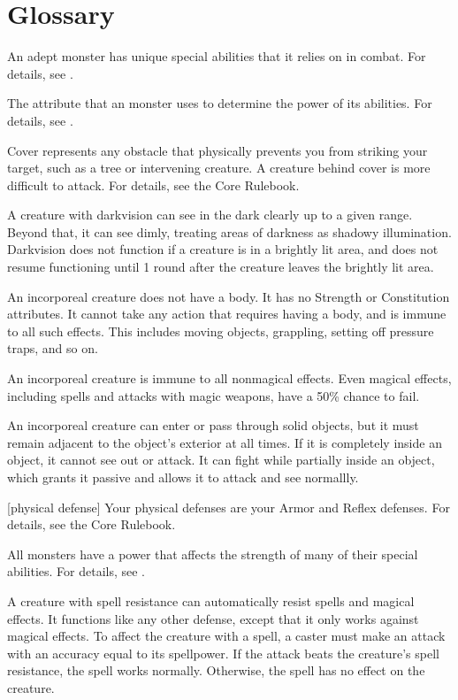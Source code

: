 \chapter{Glossary}\label{Glossary}

 An adept monster has unique special abilities that it relies on in combat.
For details, see .

 The attribute that an  monster uses to determine the power of its abilities.
For details, see .

 Cover represents any obstacle that physically prevents you from striking your target, such as a tree or intervening creature. A creature behind cover is more difficult to attack.
For details, see the Core Rulebook.

 A creature with darkvision can see in the dark clearly up to a given range.
Beyond that, it can see dimly, treating areas of darkness as shadowy illumination.
Darkvision does not function if a creature is in a brightly lit area, and does not resume functioning until 1 round after the creature leaves the brightly lit area.

 An incorporeal creature does not have a body.
It has no Strength or Constitution attributes.
It cannot take any action that requires having a body, and is immune to all such effects.
This includes moving objects, grappling, setting off pressure traps, and so on.

An incorporeal creature is immune to all nonmagical effects.
Even magical effects, including spells and attacks with magic weapons, have a 50\% chance to fail.

An incorporeal creature can enter or pass through solid objects, but it must remain adjacent to the object's exterior at all times.
If it is completely inside an object, it cannot see out or attack.
It can fight while partially inside an object, which grants it passive  and allows it to attack and see normallly.

[physical defense] Your physical defenses are your Armor and Reflex defenses.
For details, see the Core Rulebook.

 All monsters have a power that affects the strength of many of their special abilities.
For details, see .

 A creature with spell resistance can automatically resist spells and magical effects.
It functions like any other defense, except that it only works against magical effects.
To affect the creature with a spell, a caster must make an attack with an accuracy equal to its spellpower.
If the attack beats the creature's spell resistance, the spell works normally.
Otherwise, the spell has no effect on the creature.
